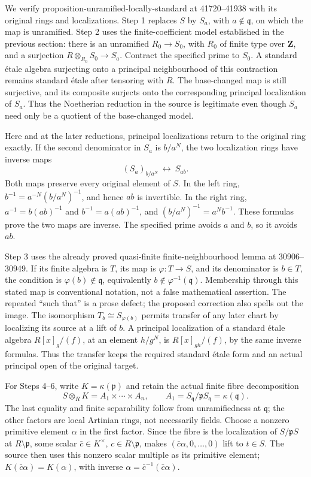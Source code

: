 We verify proposition-\AlgebraIdentifierBreak{}unramified-\AlgebraIdentifierBreak{}locally-\AlgebraIdentifierBreak{}standard at 41720--41938 with its original rings and localizations. Step 1 replaces \(S\) by \(S_a\), with \(a\notin\mathfrak q\), on which the map is unramified. Step 2 uses the finite-coefficient model established in the previous section: there is an unramified \(R_0\to S_0\), with \(R_0\) of finite type over \(\mathbf Z\), and a surjection \(R\otimes_{R_0}S_0\to S_a\). Contract the specified prime to \(S_0\). A standard étale algebra surjecting onto a principal neighbourhood of this contraction remains standard étale after tensoring with \(R\). The base-changed map is still surjective, and its composite surjects onto the corresponding principal localization of \(S_a\). Thus the Noetherian reduction in the source is legitimate even though \(S_a\) need only be a quotient of the base-changed model.

Here and at the later reductions, principal localizations return to the original ring exactly. If the second denominator in \(S_a\) is \(b/a^N\), the two localization rings have inverse maps \[
(S_a)_{b/a^N}\ \longleftrightarrow\ S_{ab}.
\] Both maps preserve every original element of \(S\). In the left ring, \(b^{-1}=a^{-N}(b/a^N)^{-1}\), and hence \(ab\) is invertible. In the right ring, \(a^{-1}=b(ab)^{-1}\) and \(b^{-1}=a(ab)^{-1}\), and \((b/a^N)^{-1}=a^Nb^{-1}\). These formulas prove the two maps are inverse. The specified prime avoids \(a\) and \(b\), so it avoids \(ab\).

Step 3 uses the already proved quasi-finite finite-neighbourhood lemma at 30906--30949. If its finite algebra is \(T\), its map is \(\varphi:T\to S\), and its denominator is \(b\in T\), the condition is \(\varphi(b)\notin\mathfrak q\), equivalently \(b\notin\varphi^{-1}(\mathfrak q)\). Membership through this stated map is conventional notation, not a false mathematical assertion. The repeated ``such that'' is a prose defect; the proposed correction also spells out the image. The isomorphism \(T_b\cong S_{\varphi(b)}\) permits transfer of any later chart by localizing its source at a lift of \(b\). A principal localization of a standard étale algebra \(R[x]_g/(f)\), at an element \(h/g^N\), is \(R[x]_{gh}/(f)\), by the same inverse formulas. Thus the transfer keeps the required standard étale form and an actual principal open of the original target.

For Steps 4--6, write \(K=\kappa(\mathfrak p)\) and retain the actual finite fibre decomposition \[
S\otimes_R K=A_1\times\cdots\times A_n,\qquad
A_1=S_{\mathfrak q}/\mathfrak pS_{\mathfrak q}
    =\kappa(\mathfrak q).
\] The last equality and finite separability follow from unramifiedness at \(\mathfrak q\); the other factors are local Artinian rings, not necessarily fields. Choose a nonzero primitive element \(\alpha\) in the first factor. Since the fibre is the localization of \(S/\mathfrak pS\) at \(R\setminus\mathfrak p\), some scalar \(\bar c\in K^\times\), \(c\in R\setminus\mathfrak p\), makes \((\bar c\alpha,0,\ldots,0)\) lift to \(t\in S\). The source then uses this nonzero scalar multiple as its primitive element; \(K(\bar c\alpha)=K(\alpha)\), with inverse \(\alpha=\bar c^{-1}(\bar c\alpha)\).

